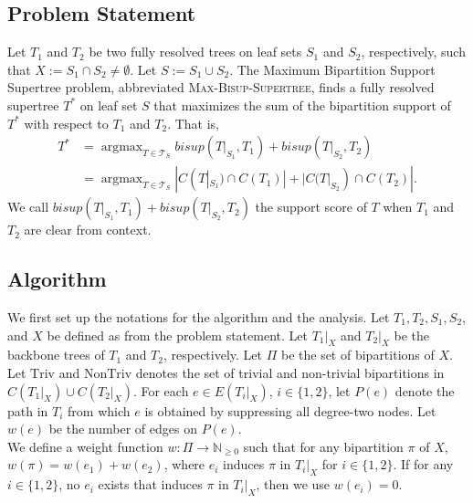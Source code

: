 \documentclass{article}
\newcommand{\triv}{\mathrm{Triv}}
\newcommand{\ntriv}{\mathrm{NonTriv}}
\DeclareMathOperator*{\argmax}{argmax}
\newcommand{\bs}{bisup}
\begin{document}
\subsection{Problem Statement}
Let $T_1$ and $T_2$ be two fully resolved trees on leaf sets $S_1$ and $S_2$, respectively, such that $X := S_1 \cap S_2 \neq \emptyset$. Let $S := S_1 \cup S_2$. The Maximum Bipartition Support Supertree problem, abbreviated \textsc{Max-Bisup-Supertree}, finds a fully resolved supertree $T^*$ on leaf set $S$ that maximizes the sum of the bipartition support of $T^*$ with respect to $T_1$ and $T_2$. That is, 
\begin{align*}
    T^* &= \argmax_{T \in \mathcal{T}_S} \bs(T|_{S_1}, T_1) + \bs(T|_{S_2}, T_2)\\ 
        &= \argmax_{T \in \mathcal{T}_S} |C(T|_{S_1})\cap C(T_1)| + |C(T|_{S_2}) \cap C(T_2)|.
\end{align*}
We call $\bs(T|_{S_1}, T_1) + \bs(T|_{S_2}, T_2)$ the support score of $T$ when $T_1$ and $T_2$ are clear from context.

\subsection{Algorithm}

We first set up the notations for the algorithm and the analysis. Let $T_1,T_2,S_1,S_2$, and $X$ be defined as from the problem statement. Let $T_1|_X$ and $T_2|_X$ be the backbone trees of $T_1$ and $T_2$, respectively. Let $\Pi$ be the set of bipartitions of $X$. Let $\triv$ and $\ntriv$ denotes the set of trivial and non-trivial bipartitions in $C(T_1|_X) \cup C(T_2|_X)$. For each $e \in E(T_i|_X)$, $i \in \{1,2\}$, let $P(e)$ denote the path in $T_i$ from which $e$ is obtained by suppressing all degree-two nodes. Let $w(e)$ be the number of edges on $P(e)$. \\

We define a weight function $w:\Pi \to \mathbb{N}_{\ge 0}$ such that for any bipartition $\pi$ of $X$, $w(\pi) = w(e_1) + w(e_2)$, where $e_i$ induces $\pi$ in $T_i|_X$ for $i \in \{1,2\}$. If for any $i \in \{1,2\}$, no $e_i$ exists that induces $\pi$ in $T_i|_X$, then we use $w(e_i) = 0$.\\
\end{document}
